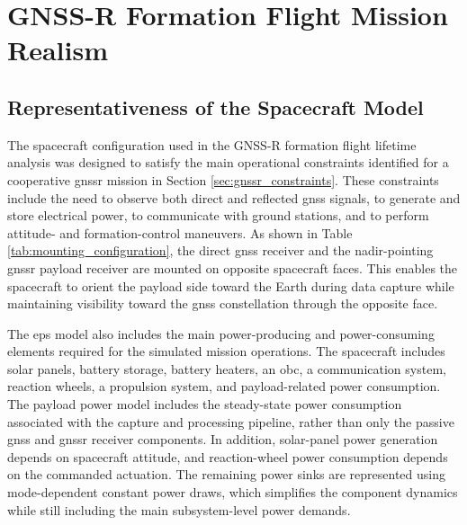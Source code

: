 \section{GNSS-R Formation Flight Mission Realism}

\subsection{Representativeness of the Spacecraft Model}

The spacecraft configuration used in the GNSS-R formation flight lifetime analysis was designed to satisfy the main operational constraints identified for a cooperative \gls{gnssr} mission in Section \ref{sec:gnssr_constraints}. These constraints include the need to observe both direct and reflected \gls{gnss} signals, to generate and store electrical power, to communicate with ground stations, and to perform attitude- and formation-control maneuvers. As shown in Table \ref{tab:mounting_configuration}, the direct \gls{gnss} receiver and the nadir-pointing \gls{gnssr} payload receiver are mounted on opposite spacecraft faces. This enables the spacecraft to orient the payload side toward the Earth during data capture while maintaining visibility toward the \gls{gnss} constellation through the opposite face.

The \gls{eps} model also includes the main power-producing and power-consuming elements required for the simulated mission operations. The spacecraft includes solar panels, battery storage, battery heaters, an \gls{obc}, a communication system, reaction wheels, a propulsion system, and payload-related power consumption. The payload power model includes the steady-state power consumption associated with the capture and processing pipeline, rather than only the passive \gls{gnss} and \gls{gnssr} receiver components. In addition, solar-panel power generation depends on spacecraft attitude, and reaction-wheel power consumption depends on the commanded actuation. The remaining power sinks are represented using mode-dependent constant power draws, which simplifies the component dynamics while still including the main subsystem-level power demands.

